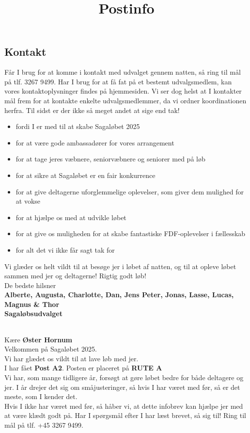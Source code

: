 \subsection{Kontakt}
Får I brug for at komme i kontakt med udvalget gennem natten, så ring til mål på tlf. 3267 9499. Har I brug for at få fat på et bestemt udvalgsmedlem, kan vores kontaktoplysninger findes på hjemmesiden. Vi ser dog helst at I kontakter mål frem for at kontakte enkelte udvalgsmedlemmer, da vi ordner koordinationen herfra.
\newline
Til sidst er der ikke så meget andet at sige end tak!\begin{itemize}
  \item fordi I er med til at skabe Sagaløbet 2025
  \item for at være gode ambassadører for vores arrangement
  \item for at tage jeres væbnere, seniorvæbnere og seniorer med på løb
  \item for at sikre at Sagaløbet er en fair konkurrence
  \item for at give deltagerne uforglemmelige oplevelser, som giver dem mulighed for at vokse
  \item for at hjælpe os med at udvikle løbet
  \item for at give os muligheden for at skabe fantastiske FDF-oplevelser i fællesskab
  \item for alt det vi ikke får sagt tak for
\end{itemize}
Vi glæder os helt vildt til at besøge jer i løbet af natten, og til at opleve løbet sammen med jer og deltagerne!
\newline
Rigtig godt løb!\\
\newline
\textcolor{søblå}{De bedste hilsner}\\
\textcolor{natblå}{\textbf{Alberte, Augusta, Charlotte, Dan, Jens Peter, Jonas, Lasse, Lucas, Magnus \& Thor}}\\
\textcolor{natblå}{\textbf{Sagaløbsudvalget}}\\
\newpage
\title{Postinfo}\\
Kære \textbf{Øster Hornum}\\
\newline
Velkommen på Sagaløbet 2025.\\
Vi har glædet os vildt til at lave løb med jer.\\
\newline
I har fået \textbf{Post A2}. Posten er placeret på \textbf{RUTE A}\\
Vi har, som mange tidligere år, forsøgt at gøre løbet bedre for både deltagere og jer. I år drejer det sig om småjusteringer, så hvis I har været med før, så er det meste, som I kender det.\\
\newline
Hvis I ikke har været med før, så håber vi, at dette infobrev kan hjælpe jer med at være klædt godt på. Har I spørgsmål efter I har læst brevet, så sig til! Ring til mål på tlf. +45 3267 9499.
